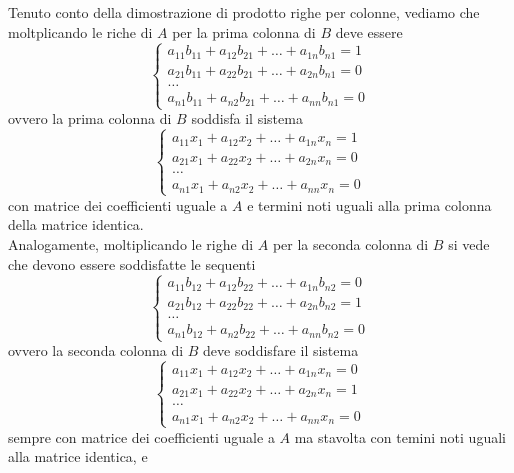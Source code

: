 Tenuto conto della dimostrazione di prodotto righe per colonne, vediamo che moltplicando le riche di $A$ per la
prima colonna di $B$ deve essere
\begin{equation*}
  \begin{cases}
    a_{11}b_{11} + a_{12}b_{21}+\dots +a_{1n}b_{n1} =1\\
    a_{21}b_{11} + a_{22}b_{21}+\dots +a_{2n}b_{n1} =0\\
    \dots\\
    a_{n1}b_{11} + a_{n2}b_{21}+\dots +a_{nn}b_{n1} =0
  \end{cases}
\end{equation*}
ovvero la prima colonna di $B$ soddisfa il sistema
\begin{equation}
   \begin{cases}
    a_{11}x_1 + a_{12}x_2+\dots +a_{1n}x_n =1\\
    a_{21}x_1 + a_{22}x_2+\dots +a_{2n}x_n =0\\
    \dots\\
    a_{n1}x_1 + a_{n2}x_2+\dots +a_{nn}x_n =0
  \end{cases}
\end{equation}
con matrice dei coefficienti uguale a $A$ e termini noti uguali alla prima colonna della matrice identica.\\
Analogamente, moltiplicando le righe di $A$ per la seconda colonna di $B$ si vede che devono essere soddisfatte
le sequenti
\begin{equation*}
  \begin{cases}
    a_{11}b_{12} + a_{12}b_{22}+\dots +a_{1n}b_{n2} =0\\
    a_{21}b_{12} + a_{22}b_{22}+\dots +a_{2n}b_{n2} =1\\
    \dots\\
    a_{n1}b_{12} + a_{n2}b_{22}+\dots +a_{nn}b_{n2} =0
  \end{cases}
\end{equation*}
ovvero la seconda colonna di $B$ deve soddisfare il sistema
\begin{equation}
   \begin{cases}
    a_{11}x_1 + a_{12}x_2+\dots +a_{1n}x_n =0\\
    a_{21}x_1 + a_{22}x_2+\dots +a_{2n}x_n =1\\
    \dots\\
    a_{n1}x_1 + a_{n2}x_2+\dots +a_{nn}x_n =0
  \end{cases}
\end{equation}
sempre con matrice dei coefficienti uguale a $A$ ma stavolta con temini noti uguali alla matrice identica, e
